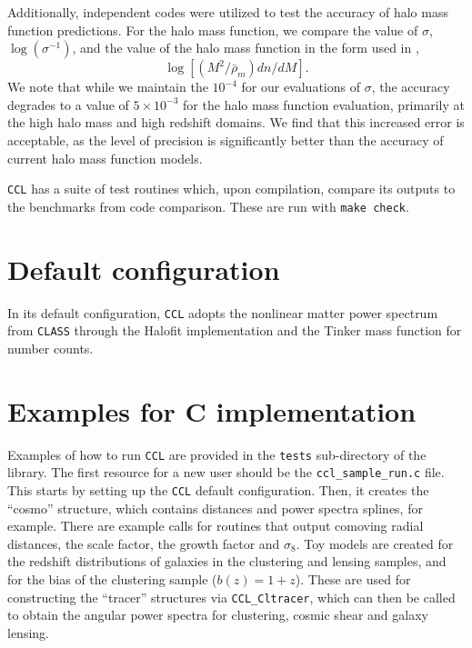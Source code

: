 \documentclass[\docopts]{\docclass}
\begin{document}
Additionally, independent codes were utilized to test the accuracy of halo mass function predictions. For the halo mass function, we compare the value of $\sigma$, $\log(\sigma^{-1})$, and the value of the halo mass function in the form used in \citep{Tinker2008},
\begin{equation}
\log[(M^2/\bar{\rho}_m)dn/dM].
\end{equation}
We note that while we maintain the $10^{-4}$ for our evaluations of $\sigma$, the accuracy degrades to a value of $5\times10^{-3}$ for the halo mass function evaluation, primarily at the high halo mass and high redshift domains. We find that this increased error is acceptable, as the level of precision is significantly better than the accuracy of current halo mass function models. 

{\tt CCL} has a suite of test routines which, upon compilation, compare its outputs to the benchmarks from code comparison. These are run with {\tt make check}.


\section{Default configuration}
\label{sec:default}

In its default configuration, {\tt CCL} adopts the nonlinear matter power spectrum from {\tt CLASS} through the Halofit implementation and the Tinker mass function for number counts.


\section{Examples for C implementation}
\label{sec:example}

Examples of how to run {\tt CCL} are provided in the {\tt tests} sub-directory of the library. The first resource for a new user should be the {\tt ccl\_sample\_run.c} file. This starts by setting up the {\tt CCL} default configuration. Then, it creates the ``cosmo'' structure, which contains distances and power spectra splines, for example. There are example calls for routines that output comoving radial distances, the scale factor, the growth factor and $\sigma_8$. Toy models are created for the redshift distributions of galaxies in the clustering and lensing samples, and for the bias of the clustering sample ($b(z)=1+z$). These are used for constructing the ``tracer'' structures via {\tt CCL\_Cltracer}, which can then be called to obtain the angular power spectra for clustering, cosmic shear and galaxy lensing.
\end{document}
